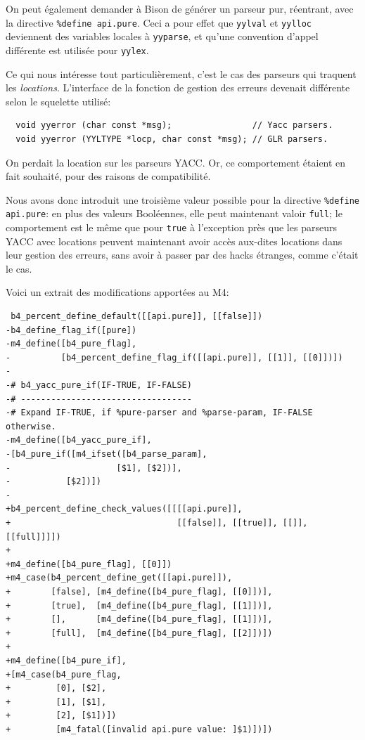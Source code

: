\documentclass[a4paper,11pt,twoside,final]{article}
\begin{document}
  On peut également demander à Bison de générer un parseur pur, réentrant, avec
  la directive \texttt{\%define api.pure}. Ceci a pour effet que
  \texttt{yylval} et \texttt{yylloc} deviennent des variables locales à
  \texttt{yyparse}, et qu'une convention d'appel différente est utilisée pour
  \texttt{yylex}.

  Ce qui nous intéresse tout particulièrement, c'est le cas des parseurs qui
  traquent les \textit{locations}. L'interface de la fonction de gestion des
  erreurs devenait différente selon le squelette utilisé:

  \begin{verbatim}
  void yyerror (char const *msg);                // Yacc parsers.
  void yyerror (YYLTYPE *locp, char const *msg); // GLR parsers.
  \end{verbatim}

  On perdait la location sur les parseurs YACC\@. Or, ce comportement étaient
  en fait souhaité, pour des raisons de compatibilité.

  Nous avons donc introduit une troisième valeur possible pour la directive
  \texttt{\%define api.pure}: en plus des valeurs Booléennes, elle peut
  maintenant valoir \texttt{full}; le comportement est le même que pour
  \texttt{true} à l'exception près que les parseurs YACC avec locations peuvent
  maintenant avoir accès aux-dites locations dans leur gestion des erreurs,
  sans avoir à passer par des hacks étranges, comme c'était le cas.

  Voici un extrait des modifications apportées au M4:

  \begin{verbatim}
 b4_percent_define_default([[api.pure]], [[false]])
-b4_define_flag_if([pure])
-m4_define([b4_pure_flag],
-          [b4_percent_define_flag_if([[api.pure]], [[1]], [[0]])])
-
-# b4_yacc_pure_if(IF-TRUE, IF-FALSE)
-# ----------------------------------
-# Expand IF-TRUE, if %pure-parser and %parse-param, IF-FALSE otherwise.
-m4_define([b4_yacc_pure_if],
-[b4_pure_if([m4_ifset([b4_parse_param],
-                     [$1], [$2])],
-           [$2])])
-
+b4_percent_define_check_values([[[[api.pure]],
+                                 [[false]], [[true]], [[]], [[full]]]])
+
+m4_define([b4_pure_flag], [[0]])
+m4_case(b4_percent_define_get([[api.pure]]),
+        [false], [m4_define([b4_pure_flag], [[0]])],
+        [true],  [m4_define([b4_pure_flag], [[1]])],
+        [],      [m4_define([b4_pure_flag], [[1]])],
+        [full],  [m4_define([b4_pure_flag], [[2]])])
+
+m4_define([b4_pure_if],
+[m4_case(b4_pure_flag,
+         [0], [$2],
+         [1], [$1],
+         [2], [$1])])
+         [m4_fatal([invalid api.pure value: ]$1)])])
  \end{verbatim}
\end{document}
